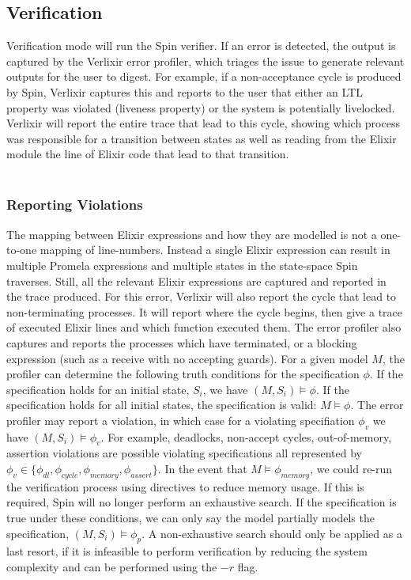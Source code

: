 \subsection{Verification}
Verification mode will run the Spin verifier. If an error is detected, the output is captured by the Verlixir error profiler, which triages the issue to generate relevant outputs for the user to digest. For example, if a non-acceptance cycle is produced by Spin, Verlixir captures this and reports to the user that either an LTL property was violated (liveness property) or the system is potentially livelocked. Verlixir will report the entire trace that lead to this cycle, showing which process was responsible for a transition between states as well as reading from the Elixir module the line of Elixir code that lead to that transition. 
\\ \\
\subsubsection{Reporting Violations}
The mapping between Elixir expressions and how they are modelled is not a one-to-one mapping of line-numbers. Instead a single Elixir expression can result in multiple Promela expressions and multiple states in the state-space Spin traverses. Still, all the relevant Elixir expressions are captured and reported in the trace produced. For this error, Verlixir will also report the cycle that lead to non-terminating processes. It will report where the cycle begins, then give a trace of executed Elixir lines and which function executed them. The error profiler also captures and reports the processes which have terminated, or a blocking expression (such as a receive with no accepting guards). For a given model $M$, the profiler can determine the following truth conditions for the specification $\phi$. If the specification holds for an initial state, $S_i$, we have $(M, S_i) \models \phi$. If the specification holds for all initial states, the specification is valid: $M \models \phi$. The error profiler may report a violation, in which case for a violating specifiation $\phi _v$ we have $(M, S_i) \models \phi _v$. For example, deadlocks, non-accept cycles, out-of-memory, assertion violations are possible violating specifications all represented by $\phi _v \in \{\phi _{dl}, \phi _{cycle}, \phi _{memory}, \phi _{assert}\}$. In the event that $M \models \phi _{memory}$, we could re-run the verification process using directives to reduce memory usage. If this is required, Spin will no longer perform an exhaustive search. If the specification is true under these conditions, we can only say the model partially models the specification, $(M, S_i) \models \phi _p$. A non-exhaustive search should only be applied as a last resort, if it is infeasible to perform verification by reducing the system complexity and can be performed using the $-r$ flag. 
\\ \\
